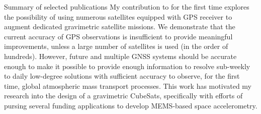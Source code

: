 \begin{cvtext}{Summary of selected publications}
My contribution to \cite{Gunter2011} for the first time explores the possibility of using numerous satellites equipped with \ac{GPS} receiver to augment dedicated gravimetric satellite missions.
We demonstrate that the current accuracy of \ac{GPS} observations is insufficient to provide meaningful improvements, unless a large number of satellites is used (in the order of hundreds).
However, future and multiple \ac{GNSS} systems should be accurate enough to make it possible to provide enough information to resolve sub-weekly to daily low-degree solutions with sufficient accuracy to observe, for the first time, global atmospheric mass transport processes.
This work has motivated my research into the design of a gravimetric CubeSats, specifically with efforts of pursing several funding applications to develop \ac{MEMS}-based space accelerometry.


\vspace{2ex}
\begin{refsection}
\nocite{
TeixeiradaEncarnacao2020,
TeixeiraEncarnacao2019,
TeixeiraEncarnacao2016,
Ditmar2012,
Gunter2011,
}
\togglefalse{bbx:url}
\printbibliography
\end{refsection}

\end{cvtext}